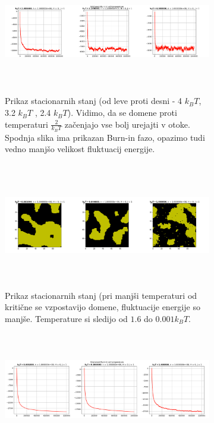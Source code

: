 \documentclass[11pt, a4paper]{article}
\begin{document}
\begin{figure}[H]
\begin{figure}[H]
\end{figure}
 \begin{figure}[H]
\centering
  \includegraphics[width=17cm, height=5.5cm]{druga_domene2_burinin.png}
\caption{Prikaz stacionarnih stanj (od leve proti desni - 4 $k_B T$, 3.2 $k_BT$ , 2.4 $k_BT$). Vidimo, da se domene proti temperaturi $\frac{2}{k_BT}$ začenjajo vse bolj urejajti v otoke. Spodnja slika ima prikazan Burn-in fazo, opazimo tudi vedno manjšo velikost fluktuacij energije.}
\end{figure}  
 \begin{figure}[H]
\centering
\hspace{-1cm}
  \includegraphics[width=18cm, height=5.5cm]{druga_domene1.png}
\caption{Prikaz stacionarnih stanj (pri manjši temperaturi od kritične se vzpostavijo domene, fluktuacije energije so manjše. Temperature si sledijo od $1.6$ do $0.001 k_BT$. }
\end{figure}
 \begin{figure}[H]
\centering
  \includegraphics[width=17cm, height=5cm]{druga_domene1_burnin.png}


\end{figure}
\end{figure}
\end{document}
